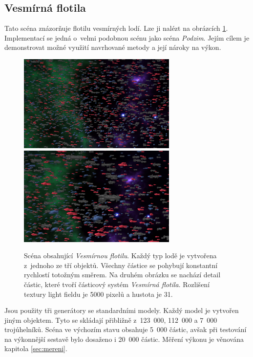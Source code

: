 \subsection*{Vesmírná flotila}
Tato scéna znázorňuje flotilu vesmírných lodí. Lze ji nalézt na obrázcích \ref{fig:ps_flotila}. Implementací se jedná o~velmi podobnou scénu jako scéna \emph{Podzim}. Jejím cílem je demonstrovat možné využití navrhované metody a její nároky na výkon.
\begin{figure}[H]
	\centering
	\includegraphics[width=0.7\textwidth]{obrazky-figures/flotila.png}
	\vspace*{1cm}
	\includegraphics[width=0.7\textwidth]{obrazky-figures/flotila_detail.png}
	\caption{Scéna obsahující \emph{Vesmírnou flotilu}. Každý typ lodě je vytvořena z~jednoho ze tří objektů. Všechny částice se pohybují konstantní rychlostí totožným směrem. Na druhém obrázku se nachází detail částic, které tvoří částicový systém \emph{Vesmírná flotila}. Rozlišení textury light fieldu je 5000 pixelů a hustota je 31.}
	\label{fig:ps_flotila}
\end{figure}


Jsou použity tři generátory se standardními modely. Každý model je vytvořen jiným objektem. Tyto se skládají přibližně z~123~000, 112~000 a 7~000 trojúhelníků. Scéna ve výchozím stavu obsahuje 5~000 částic, avšak při testování na výkonnější sestavě bylo dosaženo i 20~000 částic. Měření výkonu je věnována kapitola \ref{sec:mereni}.

